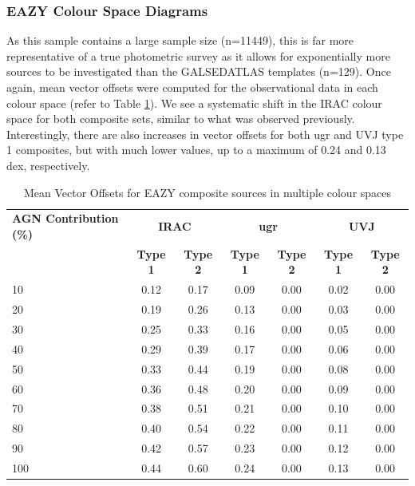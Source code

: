 \subsubsection{EAZY Colour Space Diagrams}
 As this sample contains a large sample size (n=11449), this is far more representative of a true photometric survey as it allows for exponentially more sources to be investigated than the GALSEDATLAS templates (n=129). Once again, mean vector offsets were computed for the observational data in each colour space (refer to Table \ref{tab:combined_vectoroffset}). We see a systematic shift in the IRAC colour space for both composite sets, similar to what was observed previously. Interestingly, there are also increases in vector offsets for both ugr and UVJ type 1 composites, but with much lower values, up to a maximum of 0.24 and 0.13 dex, respectively. 
\begin{table}[h!]
    \centering
    \begin{tabular}{l|cc|cc|cc} 
        \hline
        \textbf{AGN Contribution (\%)} & \multicolumn{2}{c|}{\textbf{IRAC}} & \multicolumn{2}{c|}{\textbf{ugr}} & \multicolumn{2}{c}{\textbf{UVJ}} \\
        & \textbf{Type 1} & \textbf{Type 2} & \textbf{Type 1} & \textbf{Type 2} & \textbf{Type 1} & \textbf{Type 2} \\
        \hline
        10  & 0.12 & 0.17 & 0.09 & 0.00 & 0.02 & 0.00 \\
        20  & 0.19 & 0.26 & 0.13 & 0.00 & 0.03 & 0.00 \\
        30  & 0.25 & 0.33 & 0.16 & 0.00 & 0.05 & 0.00 \\
        40  & 0.29 & 0.39 & 0.17 & 0.00 & 0.06 & 0.00 \\
        50  & 0.33 & 0.44 & 0.19 & 0.00 & 0.08 & 0.00 \\
        60  & 0.36 & 0.48 & 0.20 & 0.00 & 0.09 & 0.00 \\
        70  & 0.38 & 0.51 & 0.21 & 0.00 & 0.10 & 0.00 \\
        80  & 0.40 & 0.54 & 0.22 & 0.00 & 0.11 & 0.00 \\
        90  & 0.42 & 0.57 & 0.23 & 0.00 & 0.12 & 0.00 \\
        100 & 0.44 & 0.60 & 0.24 & 0.00 & 0.13 & 0.00 \\
        \hline
    \end{tabular}
    \caption{Mean Vector Offsets for EAZY composite sources in multiple colour spaces}
    \label{tab:combined_vectoroffset}
\end{table}
